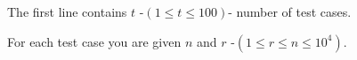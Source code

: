 The first line contains $t$ -$(1 \le t \le 100) $- number of test cases.

For each test case you are given $n$ and $r$ -$(1\le r \le n \le 10^4) $.